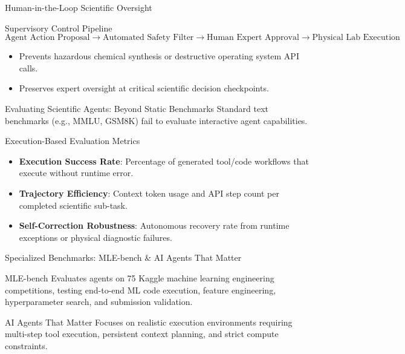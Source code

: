 \documentclass[10pt, aspectratio=169]{beamer}
\begin{document}
\begin{frame}{Human-in-the-Loop Scientific Oversight}
  \begin{block}{Supervisory Control Pipeline}
    $$\text{Agent Action Proposal} \longrightarrow \text{Automated Safety Filter} \longrightarrow \text{Human Expert Approval} \longrightarrow \text{Physical Lab Execution}$$
  \end{block}
  \begin{itemize}
    \item Prevents hazardous chemical synthesis or destructive operating system API calls.
    \item Preserves expert oversight at critical scientific decision checkpoints.
  \end{itemize}
\end{frame}

\begin{frame}{Evaluating Scientific Agents: Beyond Static Benchmarks}
  Standard text benchmarks (e.g., MMLU, GSM8K) fail to evaluate interactive agent capabilities.

  \begin{block}{Execution-Based Evaluation Metrics}
    \begin{itemize}
      \item \textbf{Execution Success Rate}: Percentage of generated tool/code workflows that execute without runtime error.
      \item \textbf{Trajectory Efficiency}: Context token usage and API step count per completed scientific sub-task.
      \item \textbf{Self-Correction Robustness}: Autonomous recovery rate from runtime exceptions or physical diagnostic failures.
    \end{itemize}
  \end{block}
\end{frame}

\begin{frame}{Specialized Benchmarks: MLE-bench \& AI Agents That Matter}
  \begin{block}{MLE-bench}
    Evaluates agents on 75 Kaggle machine learning engineering competitions, testing end-to-end ML code execution, feature engineering, hyperparameter search, and submission validation.
  \end{block}

  \begin{block}{AI Agents That Matter}
    Focuses on realistic execution environments requiring multi-step tool execution, persistent context planning, and strict compute constraints.
  \end{block}
\end{frame}
\end{document}
